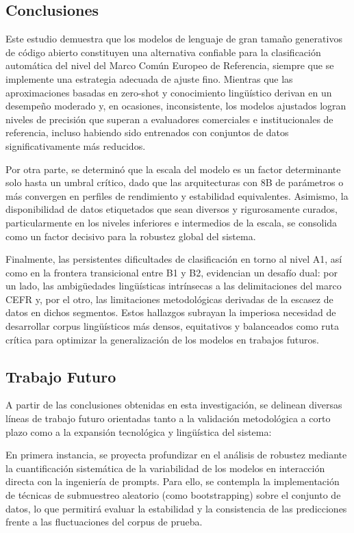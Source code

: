 \subsection{Conclusiones}\label{subsection:clas_conclusiones}

Este estudio demuestra que los modelos de lenguaje de gran tamaño generativos de código abierto constituyen una alternativa confiable para la clasificación automática del nivel del Marco Común Europeo de Referencia, siempre que se implemente una estrategia adecuada de ajuste fino. Mientras que las aproximaciones basadas en zero-shot y conocimiento lingüístico derivan en un desempeño moderado y, en ocasiones, inconsistente, los modelos ajustados logran niveles de precisión que superan a evaluadores comerciales e institucionales de referencia, incluso habiendo sido entrenados con conjuntos de datos significativamente más reducidos.

Por otra parte, se determinó que la escala del modelo es un factor determinante solo hasta un umbral crítico, dado que las arquitecturas con 8B de parámetros o más convergen en perfiles de rendimiento y estabilidad equivalentes. Asimismo, la disponibilidad de datos etiquetados que sean diversos y rigurosamente curados, particularmente en los niveles inferiores e intermedios de la escala, se consolida como un factor decisivo para la robustez global del sistema.

Finalmente, las persistentes dificultades de clasificación en torno al nivel A1, así como en la frontera transicional entre B1 y B2, evidencian un desafío dual: por un lado, las ambigüedades lingüísticas intrínsecas a las delimitaciones del marco CEFR y, por el otro, las limitaciones metodológicas derivadas de la escasez de datos en dichos segmentos. Estos hallazgos subrayan la imperiosa necesidad de desarrollar corpus lingüísticos más densos, equitativos y balanceados como ruta crítica para optimizar la generalización de los modelos en trabajos futuros.

\subsection{Trabajo Futuro}\label{subsection:clas_trab_fut}

A partir de las conclusiones obtenidas en esta investigación, se delinean diversas líneas de trabajo futuro orientadas tanto a la validación metodológica a corto plazo como a la expansión tecnológica y lingüística del sistema:

En primera instancia, se proyecta profundizar en el análisis de robustez mediante la cuantificación sistemática de la variabilidad de los modelos en interacción directa con la ingeniería de prompts. Para ello, se contempla la implementación de técnicas de submuestreo aleatorio (como bootstrapping) sobre el conjunto de datos, lo que permitirá evaluar la estabilidad y la consistencia de las predicciones frente a las fluctuaciones del corpus de prueba.

